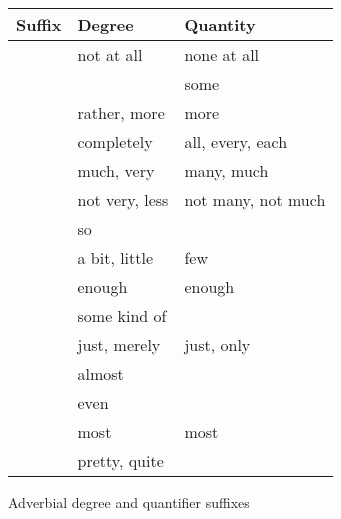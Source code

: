\begin{figure}[tp]\centering
\caption{Adverbial degree and quantifier suffixes}
\begin{tabu} to \linewidth {X X X}
\toprule\tableheaderfont
Suffix
	& Degree
	& Quantity
	\\

\toprule
	
	& not at all
	& none at all
	\\

	& 
	& some
	\\

	& rather, more
	& more
	\\
	
	& completely
	& all, every, each
	\\

	& much, very
	& many, much
	\\
	
	& not very, less
	& not many, not much
	\\
	
	& so
	&
	\\
	
	& a bit, little
	& few
	\\

	& enough
	& enough
	\\

	& some kind of
	&
	\\

	& just, merely
	& just, only
	\\
	
	& almost
	&
	\\

	& even
	&
	\\
	
	& most
	& most
	\\

	& pretty, quite
	&
	\\

\bottomrule
\end{tabu}
\label{fig:quantifiers}
\end{figure}

